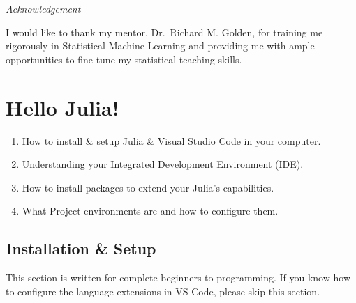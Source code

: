 \documentclass[
  letterpaper,
]{book}
\providecommand{\tightlist}{%
  \setlength{\itemsep}{0pt}\setlength{\parskip}{0pt}}\usepackage{longtable,booktabs,array}
\begin{document}
\emph{Acknowledgement}

I would like to thank my mentor, Dr.~Richard M. Golden, for training me
rigorously in Statistical Machine Learning and providing me with ample
opportunities to fine-tune my statistical teaching skills.

\hypertarget{hello-julia}{%
\chapter{Hello Julia!}\label{hello-julia}}

\begin{tcolorbox}[standard jigsaw,bottomtitle=1mm, titlerule=0mm, title={In this chapter you'll learn:}, leftrule=.75mm, toptitle=1mm, arc=.35mm, rightrule=.15mm, opacitybacktitle=0.6, colframe=quarto-callout-caution-color-frame, bottomrule=.15mm, colbacktitle=quarto-callout-caution-color!10!white, colback=white, toprule=.15mm, left=2mm, coltitle=black, opacityback=0]

\begin{enumerate}
\def\labelenumi{\arabic{enumi}.}
\tightlist
\item
  How to install \& setup Julia \& Visual Studio Code in your computer.
\item
  Understanding your Integrated Development Environment (IDE).
\item
  How to install packages to extend your Julia's capabilities.
\item
  What Project environments are and how to configure them.
\end{enumerate}

\end{tcolorbox}

\hypertarget{installation-setup}{%
\section{Installation \& Setup}\label{installation-setup}}

\begin{tcolorbox}[standard jigsaw,bottomtitle=1mm, titlerule=0mm, title=\textcolor{quarto-callout-note-color}{\faInfo}\hspace{0.5em}{Note}, leftrule=.75mm, toptitle=1mm, arc=.35mm, rightrule=.15mm, opacitybacktitle=0.6, colframe=quarto-callout-note-color-frame, bottomrule=.15mm, colbacktitle=quarto-callout-note-color!10!white, colback=white, toprule=.15mm, left=2mm, coltitle=black, opacityback=0]
This section is written for complete beginners to programming. If you
know how to configure the language extensions in VS Code, please skip
this section.
\end{tcolorbox}
\end{document}
